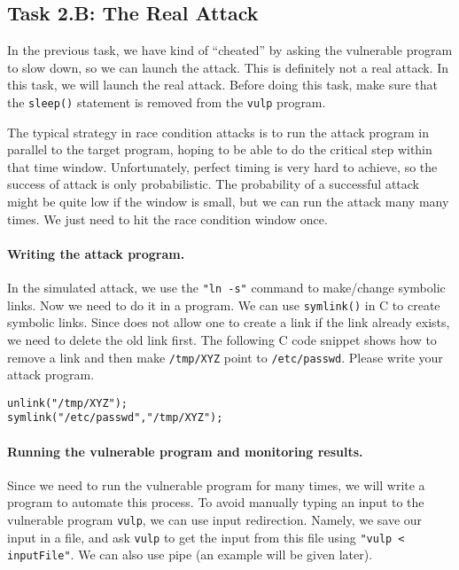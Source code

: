 \subsection{Task 2.B: The Real Attack}

In the previous task, we have kind of ``cheated'' by asking the vulnerable program
to slow down, so we can launch the attack. This is definitely not a real attack.
In this task, we will launch the real attack. 
Before doing this task, make sure that the \texttt{sleep()} statement is removed 
from the \texttt{vulp} program. 


The typical strategy in race condition attacks is to run the attack
program in parallel to the target program, 
hoping to be able to do the critical step within that time window.
Unfortunately, perfect timing is very hard to achieve, so 
the success of attack is only probabilistic.
The probability of a successful attack might be quite low if the window
is small, but we can run the attack many many times. 
We just need to hit the race condition window once.  


\paragraph{Writing the attack program.} In the simulated attack,
we use the \texttt{"ln -s"} command to make/change symbolic links.
Now we need to do it in a program.
We can use {\tt symlink()} in C to create symbolic links.
Since \linux does not allow one to create a link if the link already exists,
we need to delete the old link first.
The following C code snippet shows how to remove a link and then make
{\tt /tmp/XYZ} point to {\tt /etc/passwd}. Please write your attack 
program.

\begin{lstlisting}
unlink("/tmp/XYZ");
symlink("/etc/passwd","/tmp/XYZ");
\end{lstlisting}



\paragraph{Running the vulnerable program and monitoring results.}
Since we need to run the vulnerable program for many
times, we will write a program to automate this process. 
To avoid manually typing an input to the vulnerable program \texttt{vulp}, 
we can use input redirection. Namely, we save our input in a file, and ask
\texttt{vulp} to get the input from this file using \texttt{"vulp <
inputFile"}. We can also use pipe (an example will be given later). 

